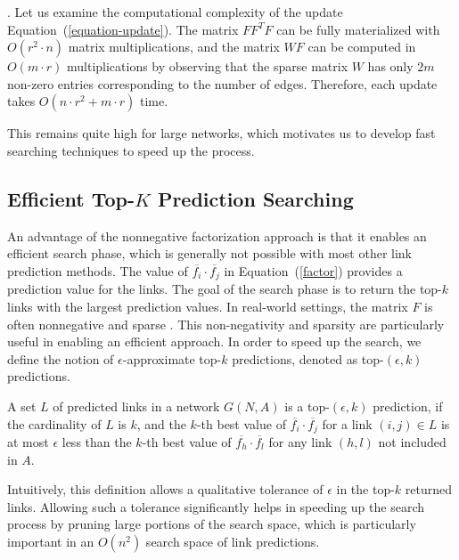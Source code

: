 . Let us examine the computational complexity of
the update Equation~(\ref{equation-update}).
The matrix $F F^T F$  can be fully materialized  with
$O(r^2 \cdot n)$ matrix multiplications, and the matrix $W F$ can be
computed in $O(m \cdot r)$ multiplications  by observing that the
sparse matrix $W$ has only $2m$ non-zero entries corresponding to the
number of edges. Therefore, each update takes $O(n
\cdot r^2 +m\cdot r )$ time.

This remains quite high for large networks, which motivates us to develop fast searching techniques to speed up the process.


\subsection{Efficient Top-$K$ Prediction Searching}
\label{sec-NMF-topk}

An advantage of the nonnegative factorization approach is that it
enables an efficient search phase, which is generally not possible
with most other link prediction methods. The value of
$\overline{f_i} \cdot \overline{f_j}$ in Equation~(\ref{factor}) provides a prediction value
for the links. The goal of the search phase is to return the top-$k$
links with the largest prediction values. In real-world settings, the matrix $F$ is
often nonnegative and sparse \cite{NMF-nature99}. This non-negativity and sparsity are
particularly useful in enabling an efficient approach. In order to
speed up the search, we define the notion of $\epsilon$-approximate
top-$k$ predictions, denoted as top-$(\epsilon, k)$ predictions.


\begin{definition}[top-$(\epsilon, k)$ predictions]
A set $L$ of predicted links in a network $G(N, A)$ is a top-$(\epsilon, k)$ prediction, if
the cardinality of $L$ is $k$, and the $k$-th best  value of
$\overline{f_i} \cdot \overline{f_j} $ for a link $(i, j) \in L$ is
at most $\epsilon$ less than the $k$-th best value of
$\overline{f_h} \cdot \overline{f_l}$ for any link $(h , l)$ not included in $A$.
\end{definition}
Intuitively, this definition allows a qualitative  tolerance of
$\epsilon$ in the top-$k$ returned links. Allowing such a tolerance
significantly helps in speeding up the search process by pruning
large portions of the search space, which is particularly important
in an $O(n^2)$ search space of link predictions.

